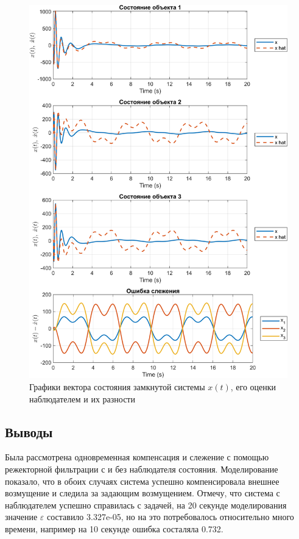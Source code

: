 \begin{figure}[H]
    \centering
    \includegraphics[width=\linewidth]{figs/3_1_1_sim.png}
    \caption{Графики вектора состояния замкнутой системы $x(t)$, 
    его оценки наблюдателем и их разности}
    \label{fig:3_1_1_sim}
\end{figure}


\subsection{Выводы}

Была рассмотрена одновременная компенсация и слежение с помощью режекторной фильтрации с и без наблюдателя состояния.
Моделирование показало,
что в обоих случаях система успешно компенсировала внешнее возмущение и следила
за задающим возмущением. Отмечу, что система с наблюдателем
успешно справилась с задачей, на 20 секунде моделирования значение $\varepsilon$ составило 3.327e-05, но на
это потребовалось относительно много времени, например на 10 секунде ошибка состаляла 0.732.


